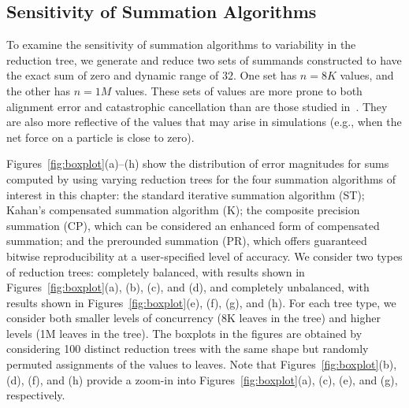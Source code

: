 \subsection{Sensitivity of Summation Algorithms}

To examine the sensitivity of summation algorithms to variability in
the reduction tree, we generate and reduce two sets of summands
constructed to have the exact sum of zero and dynamic range of
$32$. One set has $n=8K$ values, and the other has $n=1M$ values.
These sets of values are more prone to both alignment error and
catastrophic cancellation than are those studied in~\cite{chiang13}.
They are also more reflective of the values that may arise in
simulations (e.g., when the net force on a particle is close to zero).

Figures~\ref{fig:boxplot}(a)--(h) show the distribution of error
magnitudes for sums computed by using varying reduction trees for the
four summation algorithms of interest in this chapter: the standard
iterative summation algorithm (ST); Kahan's compensated summation
algorithm (K); the composite precision summation (CP), which can be
considered an enhanced form of compensated summation; and the
prerounded summation (PR), which offers guaranteed bitwise
reproducibility at a user-specified level of accuracy. We consider two
types of reduction trees: completely balanced, with results shown in
Figures~\ref{fig:boxplot}(a), (b), (c), and (d), and completely
unbalanced, with results shown in Figures~\ref{fig:boxplot}(e), (f),
(g), and (h). For each tree type, we consider both smaller levels of
concurrency (8K leaves in the tree) and higher levels (1M leaves in
the tree). The boxplots in the figures are obtained by considering 100
distinct reduction trees with the same shape but randomly permuted
assignments of the values to leaves. Note that
Figures~\ref{fig:boxplot}(b), (d), (f), and (h) provide a zoom-in into
Figures~\ref{fig:boxplot}(a), (c), (e), and (g), respectively.
